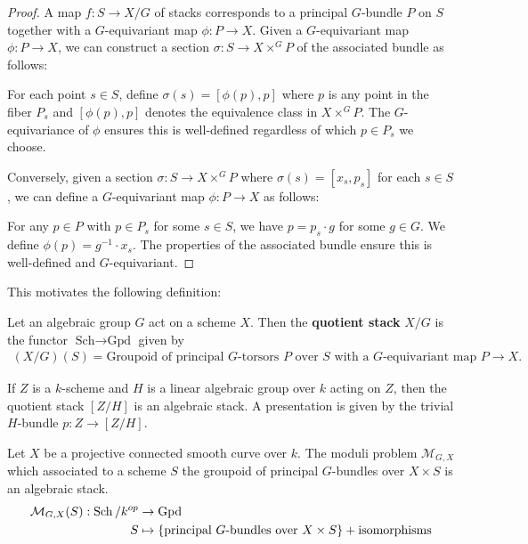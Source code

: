 \documentclass[12pt]{article}
\begin{document}
\begin{proof}
    A map $f: S \to X/G$ of stacks corresponds to a principal $G$-bundle $P$ on $S$ together with a $G$-equivariant map $\phi: P \to X$. Given a $G$-equivariant map $\phi: P \to X$, we can construct a section $\sigma: S \to X \times^G P$ of the associated bundle as follows:

    For each point $s \in S$, define $\sigma(s) = [\phi(p), p]$ where $p$ is any point in the fiber $P_s$ and $[\phi(p), p]$ denotes the equivalence class in $X \times^G P$. The $G$-equivariance of $\phi$ ensures this is well-defined regardless of which $p \in P_s$ we choose.


    Conversely, given a section $\sigma: S \to X \times^G P$ where $\sigma(s) = [x_s, p_s]$ for each $s \in S$, we can define a $G$-equivariant map $\phi: P \to X$ as follows:

    For any $p \in P$ with $p \in P_s$ for some $s \in S$, we have $p = p_s \cdot g$ for some $g \in G$. We define $\phi(p) = g^{-1} \cdot x_s$. The properties of the associated bundle ensure this is well-defined and $G$-equivariant.
\end{proof}

This motivates the following definition:
\begin{definition}
    Let an algebraic group $G$ act on a scheme $X$. Then the \textbf{quotient stack} $X/G$ is the functor $\text{Sch} \to \text{Gpd}$ given by
    \begin{align*}
        (X/G)(S) = \text{Groupoid of principal $G$-torsors $P$ over $S$ with a $G$-equivariant map $P \to X$}.
    \end{align*}
\end{definition}


\begin{example}
    If $Z$ is a $k$-scheme and $H$ is a linear algebraic group over $k$ acting on $Z$, then the quotient stack $[Z/H]$ is an algebraic stack. A presentation is given by the trivial $H$-bundle $p:Z \to [Z/H]$.
\end{example}

\begin{example}
    Let $X$ be a projective connected smooth curve over $k$. The moduli problem $\mathcal{M}_{G,X}$ which associated to a scheme $S$ the groupoid of principal $G$-bundles over $X \times S$ is an algebraic stack. \begin{align*}
        \mathcal{M}_{G,X}(S):\operatorname{Sch}/k^{op} & \to \operatorname{Gpd}                                                                             \\
        S                                & \mapsto \{ \text{principal $G$-bundles over } X \times S \} + {\text{isomorphisms} }
    \end{align*}
\end{example}
\end{document}
